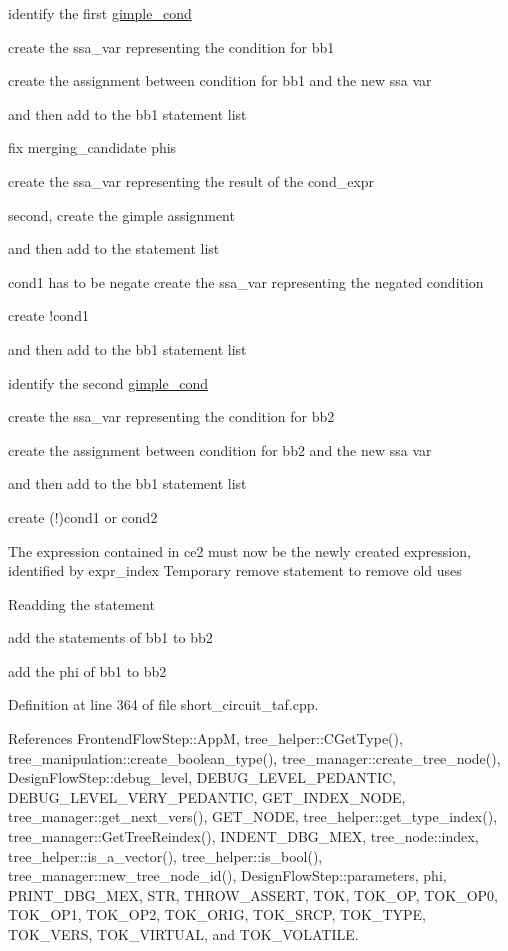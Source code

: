 identify the first \hyperlink{structgimple__cond}{gimple\+\_\+cond}

create the ssa\+\_\+var representing the condition for bb1

create the assignment between condition for bb1 and the new ssa var

and then add to the bb1 statement list

fix merging\+\_\+candidate phis

create the ssa\+\_\+var representing the result of the cond\+\_\+expr

second, create the gimple assignment

and then add to the statement list

cond1 has to be negate create the ssa\+\_\+var representing the negated condition

create !cond1

and then add to the bb1 statement list

identify the second \hyperlink{structgimple__cond}{gimple\+\_\+cond}

create the ssa\+\_\+var representing the condition for bb2

create the assignment between condition for bb2 and the new ssa var

and then add to the bb1 statement list

create (!)cond1 or cond2

The expression contained in ce2 must now be the newly created expression, identified by expr\+\_\+index Temporary remove statement to remove old uses

Readding the statement

add the statements of bb1 to bb2

add the phi of bb1 to bb2 

Definition at line 364 of file short\+\_\+circuit\+\_\+taf.\+cpp.



References Frontend\+Flow\+Step\+::\+AppM, tree\+\_\+helper\+::\+C\+Get\+Type(), tree\+\_\+manipulation\+::create\+\_\+boolean\+\_\+type(), tree\+\_\+manager\+::create\+\_\+tree\+\_\+node(), Design\+Flow\+Step\+::debug\+\_\+level, D\+E\+B\+U\+G\+\_\+\+L\+E\+V\+E\+L\+\_\+\+P\+E\+D\+A\+N\+T\+IC, D\+E\+B\+U\+G\+\_\+\+L\+E\+V\+E\+L\+\_\+\+V\+E\+R\+Y\+\_\+\+P\+E\+D\+A\+N\+T\+IC, G\+E\+T\+\_\+\+I\+N\+D\+E\+X\+\_\+\+N\+O\+DE, tree\+\_\+manager\+::get\+\_\+next\+\_\+vers(), G\+E\+T\+\_\+\+N\+O\+DE, tree\+\_\+helper\+::get\+\_\+type\+\_\+index(), tree\+\_\+manager\+::\+Get\+Tree\+Reindex(), I\+N\+D\+E\+N\+T\+\_\+\+D\+B\+G\+\_\+\+M\+EX, tree\+\_\+node\+::index, tree\+\_\+helper\+::is\+\_\+a\+\_\+vector(), tree\+\_\+helper\+::is\+\_\+bool(), tree\+\_\+manager\+::new\+\_\+tree\+\_\+node\+\_\+id(), Design\+Flow\+Step\+::parameters, phi, P\+R\+I\+N\+T\+\_\+\+D\+B\+G\+\_\+\+M\+EX, S\+TR, T\+H\+R\+O\+W\+\_\+\+A\+S\+S\+E\+RT, T\+OK, T\+O\+K\+\_\+\+OP, T\+O\+K\+\_\+\+O\+P0, T\+O\+K\+\_\+\+O\+P1, T\+O\+K\+\_\+\+O\+P2, T\+O\+K\+\_\+\+O\+R\+IG, T\+O\+K\+\_\+\+S\+R\+CP, T\+O\+K\+\_\+\+T\+Y\+PE, T\+O\+K\+\_\+\+V\+E\+RS, T\+O\+K\+\_\+\+V\+I\+R\+T\+U\+AL, and T\+O\+K\+\_\+\+V\+O\+L\+A\+T\+I\+LE.




